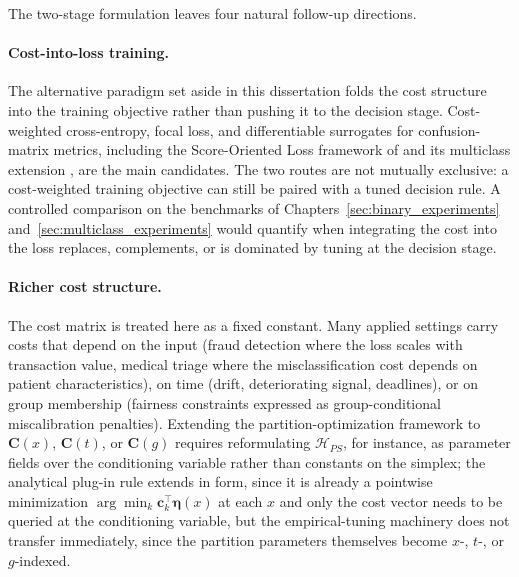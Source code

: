 The two-stage formulation leaves four natural follow-up directions.

\paragraph{Cost-into-loss training.} The alternative paradigm set aside in this dissertation folds the cost structure into the training objective rather than pushing it to the decision stage. Cost-weighted cross-entropy, focal loss, and differentiable surrogates for confusion-matrix metrics, including the Score-Oriented Loss framework of \citet{marchetti2022sol} and its multiclass extension \citep{marchetti2025multisol}, are the main candidates. The two routes are not mutually exclusive: a cost-weighted training objective can still be paired with a tuned decision rule. A controlled comparison on the benchmarks of Chapters~\ref{sec:binary_experiments} and~\ref{sec:multiclass_experiments} would quantify when integrating the cost into the loss replaces, complements, or is dominated by tuning at the decision stage.

\paragraph{Richer cost structure.} The cost matrix is treated here as a fixed constant. Many applied settings carry costs that depend on the input (fraud detection where the loss scales with transaction value, medical triage where the misclassification cost depends on patient characteristics), on time (drift, deteriorating signal, deadlines), or on group membership (fairness constraints expressed as group-conditional miscalibration penalties). Extending the partition-optimization framework to $\mathbf{C}(x)$, $\mathbf{C}(t)$, or $\mathbf{C}(g)$ requires reformulating $\mathcal{H}_{PS}$, for instance, as parameter fields over the conditioning variable rather than constants on the simplex; the analytical plug-in rule extends in form, since it is already a pointwise minimization $\arg\min_k \mathbf{c}_k^\top \boldsymbol{\eta}(x)$ at each $x$ and only the cost vector needs to be queried at the conditioning variable, but the empirical-tuning machinery does not transfer immediately, since the partition parameters themselves become $x$-, $t$-, or $g$-indexed.

